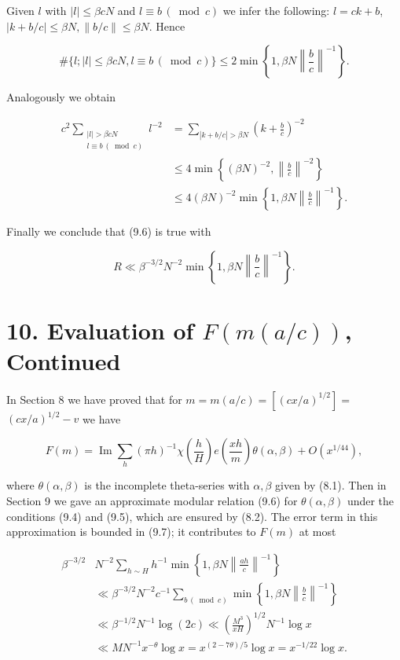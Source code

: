 \documentclass[10pt]{article}
\begin{document}
Given $l$ with $|l| \leqslant \beta c N$ and $l \equiv b\, (\bmod c)$ we infer the following: $l=c k+b$, $|k+b / c| \leqslant \beta N,\|b / c\| \leqslant \beta N$. Hence

$$
\#\{l ;|l| \leqslant \beta c N, l \equiv b\, (\bmod c)\} \leqslant 2 \min \left\{1, \beta N\left\|\frac{b}{c}\right\|^{-1}\right\} .
$$

Analogously we obtain

$$
\begin{aligned}
c^{2}\sum_{\substack{|l|>\beta cN\\ l\equiv b\, (\bmod c)}}l^{-2}
&=\sum_{|k+b/c|>\beta N}\left(k+\frac bc\right)^{-2}\\
&\leqslant 4\min\left\{(\beta N)^{-2},\left\|\frac bc\right\|^{-2}\right\}\\
&\leqslant 4(\beta N)^{-2}\min\left\{1,\beta N\left\|\frac bc\right\|^{-1}\right\}.
\end{aligned}
$$

Finally we conclude that (9.6) is true with


\begin{equation*}
R \ll \beta^{-3 / 2} N^{-2} \min \left\{1, \beta N\left\|\frac{b}{c}\right\|^{-1}\right\} . \tag{9.7}
\end{equation*}


\section*{10. Evaluation of $F(m(a / c))$, Continued}
In Section 8 we have proved that for $m=m(a / c)=\left[(c x / a)^{1 / 2}\right]=$ $(c x / a)^{1 / 2}-v$ we have

$$
F(m)=\operatorname{Im}\sum_{h}(\pi h)^{-1} \chi\left(\frac{h}{H}\right) e\left(\frac{x h}{m}\right) \theta(\alpha, \beta)+O\left(x^{1 / 44}\right),
$$

where $\theta(\alpha, \beta)$ is the incomplete theta-series with $\alpha, \beta$ given by (8.1). Then in Section 9 we gave an approximate modular relation (9.6) for $\theta(\alpha, \beta)$ under the conditions (9.4) and (9.5), which are ensured by (8.2). The error term in this approximation is bounded in (9.7); it contributes to $F(m)$ at most

$$
\begin{aligned}
\beta^{-3 / 2} & N^{-2} \sum_{h \sim H} h^{-1} \min \left\{1, \beta N\left\|\frac{a h}{c}\right\|^{-1}\right\} \\
& \ll \beta^{-3 / 2} N^{-2} c^{-1} \sum_{b\, (\bmod c)} \min \left\{1, \beta N\left\|\frac{b}{c}\right\|^{-1}\right\} \\
& \ll\beta^{-1/2}N^{-1}\log(2c)\ll\left(\frac{M^{3}}{x H}\right)^{1 / 2} N^{-1} \log x \\
& \ll M N^{-1} x^{-\theta} \log x=x^{(2-7 \theta) / 5} \log x=x^{-1 / 22} \log x .
\end{aligned}
$$
\end{document}
